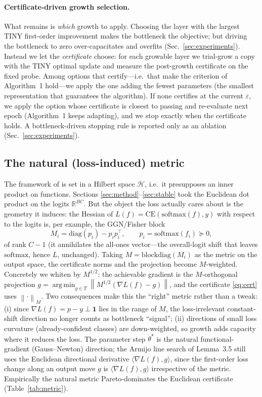 \documentclass{article}
\DeclareMathOperator*{\argmin}{arg\,min}
\newcommand{\R}{\mathbb{R}}
\newcommand{\norm}[1]{\left\lVert #1 \right\rVert}
\newcommand{\inner}[2]{\langle #1, #2 \rangle}
\newcommand{\grad}{\nabla}
\newcommand{\eps}{\varepsilon}
\begin{document}
\paragraph{Certificate-driven growth selection.} What remains is \emph{which}
growth to apply. Choosing the layer with the largest TINY first-order improvement
makes the bottleneck the objective; but driving the bottleneck to zero
over-capacitates and overfits (Sec.~\ref{sec:experiments}). Instead we let the
\emph{certificate} choose: for each growable layer we trial-grow a copy with the
TINY optimal update and measure the post-growth certificate on the fixed probe.
Among options that certify---i.e.\ that make the criterion of Algorithm~1
hold---we apply the one adding the fewest parameters (the smallest representation
that guarantees the algorithm). If none certifies at the current $\eps$, we apply
the option whose certificate is closest to passing and re-evaluate next epoch
(Algorithm~1 keeps adapting), and we stop exactly when the certificate holds. A
bottleneck-driven stopping rule is reported only as an ablation
(Sec.~\ref{sec:experiments}).

\subsection{The natural (loss-induced) metric}\label{sec:metric}
The framework of \citet{fgd2025} is set in a Hilbert space $\mathcal{H}$, i.e.\ it
presupposes an inner product on functions. Sections \ref{sec:method}--\ref{sec:stable}
took the Euclidean dot product on the logits $\R^{BC}$. But the object the loss
actually cares about is the geometry it induces: the Hessian of
$L(f)=\mathrm{CE}(\mathrm{softmax}(f),y)$ with respect to the logits is, per
example, the GGN/Fisher block
\begin{equation}\label{eq:ggn}
  M_i=\mathrm{diag}(p_i)-p_i p_i^\top,\qquad p_i=\mathrm{softmax}(f_i)\succeq0,
\end{equation}
of rank $C{-}1$ (it annihilates the all-ones vector---the overall-logit shift that
leaves $\mathrm{softmax}$, hence $L$, unchanged). Taking $M=\mathrm{blockdiag}(M_i)$
as the metric on the output space, the certificate norms and the projection become
$M$-weighted. Concretely we whiten by $M^{1/2}$: the achievable gradient is the
$M$-orthogonal projection $g=\argmin_{g\in T}\norm{M^{1/2}(\grad L(f)-g)}$, and the
certificate \eqref{eq:cert} uses $\norm{\cdot}_M$. Two consequences make this the
``right'' metric rather than a tweak: (i) since $\grad L(f)=p-y\perp\mathbf 1$ lies
in the range of $M$, the loss-irrelevant constant-shift direction no longer counts
as bottleneck ``signal''; (ii) directions of small loss curvature (already-confident
classes) are down-weighted, so growth adds capacity where it reduces the loss. The
parameter step $\dot\theta^\star$ is the natural functional-gradient (Gauss--Newton)
direction; the Armijo line search of Lemma~3.5 still uses the Euclidean directional
derivative $\inner{\grad L(f)}{g}$, since the first-order loss change along an output
move $g$ is $\inner{\grad L(f)}{g}$ irrespective of the metric. Empirically the
natural metric Pareto-dominates the Euclidean certificate (Table~\ref{tab:metric}).
\end{document}
